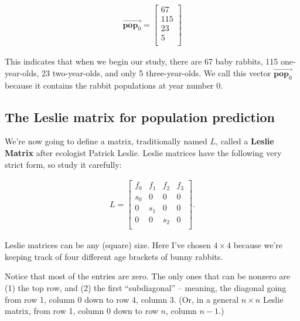 \begin{alttitles}
\vspace{-.15in}
\begin{align*}
\overrightarrow{\textbf{pop}_0} =
\begin{bmatrix}
67 \\ 115 \\ 23 \\ 5 \\
\end{bmatrix}
\end{align*}
\vspace{-.15in}

This indicates that when we begin our study, there are 67 baby rabbits, 115
one-year-olds, 23 two-year-olds, and only 5 three-year-olds. We call this
vector $\overrightarrow{\textbf{pop}_0}$ because it contains the rabbit
populations at year number 0.

\subsection{The Leslie matrix for population prediction}


We're now going to define a matrix, traditionally named $L$, called a
\textbf{Leslie Matrix} after ecologist Patrick Leslie. Leslie matrices have the
following very strict form, so study it carefully:

\vspace{-.15in}
\begin{align*}
L =
\begin{bmatrix}
f_0 & f_1 & f_2 & f_3 \\
s_0 & 0 & 0 & 0 \\
0 & s_1 & 0 & 0 \\
0 & 0 & s_2 & 0 \\
\end{bmatrix}.
\end{align*}
\vspace{-.15in}

Leslie matrices can be any (square) size. Here I've chosen $4\times 4$ because
we're keeping track of four different age brackets of bunny rabbits.


Notice that most of the entries are zero. The only ones that can be nonzero are
(1) the top row, and (2) the first ``subdiagonal'' -- meaning, the diagonal
going from row 1, column 0 down to row 4, column 3. (Or, in a general $n\times
n$ Leslie matrix, from row 1, column 0 down to row $n$, column $n-1$.)


\end{alttitles}
